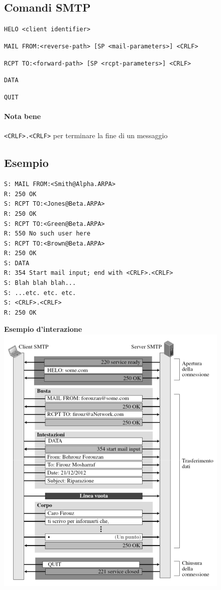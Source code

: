 \documentclass[10pt]{article}
\begin{document}
\begin{multicols}{2}
\subsection{Comandi SMTP}
\begin{list}{}{Alcuni comandi:}
\item \texttt{HELO <client identifier>}
\item \texttt{MAIL FROM:<reverse-path> [SP <mail-parameters>] <CRLF>}
\item \texttt{RCPT TO:<forward-path> [SP <rcpt-parameters>] <CRLF>}
\item \texttt{DATA}
\item \texttt{QUIT}
\end{list}
\paragraph{Nota bene} \texttt{<CRLF>.<CRLF>} per terminare la fine di un messaggio
\subsection{Esempio}
\begin{verbatim}
S: MAIL FROM:<Smith@Alpha.ARPA>
R: 250 OK
S: RCPT TO:<Jones@Beta.ARPA>
R: 250 OK
S: RCPT TO:<Green@Beta.ARPA>
R: 550 No such user here
S: RCPT TO:<Brown@Beta.ARPA>
R: 250 OK
S: DATA
R: 354 Start mail input; end with <CRLF>.<CRLF>
S: Blah blah blah...
S: ...etc. etc. etc.
S: <CRLF>.<CRLF>
R: 250 OK
\end{verbatim}
\columnbreak
\textbf{Esempio d'interazione}\\
\includegraphics[scale=0.68]{smtpesempio.png}
\end{multicols}
\pagebreak
\end{document}
